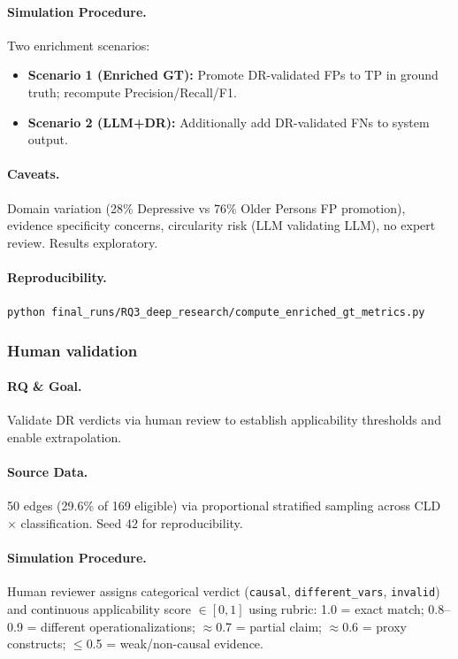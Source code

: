 \paragraph{Simulation Procedure.}
Two enrichment scenarios:
\begin{itemize}[noitemsep]
    \item \textbf{Scenario 1 (Enriched GT):} Promote DR-validated FPs to TP in ground truth; recompute Precision/Recall/F1.
    \item \textbf{Scenario 2 (LLM+DR):} Additionally add DR-validated FNs to system output.
\end{itemize}

\paragraph{Caveats.}
Domain variation (28\% Depressive vs 76\% Older Persons FP promotion), evidence specificity concerns, circularity risk (LLM validating LLM), no expert review. Results exploratory.

\paragraph{Reproducibility.}
\texttt{python final\_runs/RQ3\_deep\_research/compute\_enriched\_gt\_metrics.py}

\subsubsection{Human validation}
\label{sec:rq3_human_validation}

\paragraph{RQ \& Goal.}
Validate DR verdicts via human review to establish applicability thresholds and enable extrapolation.

\paragraph{Source Data.}
50 edges (29.6\% of 169 eligible) via proportional stratified sampling across CLD $\times$ classification. Seed 42 for reproducibility.

\paragraph{Simulation Procedure.}
Human reviewer assigns categorical verdict (\texttt{causal}, \texttt{different\_vars}, \texttt{invalid}) and continuous applicability score $\in[0,1]$ using rubric: 1.0 = exact match; 0.8--0.9 = different operationalizations; $\approx$0.7 = partial claim; $\approx$0.6 = proxy constructs; $\leq$0.5 = weak/non-causal evidence.

